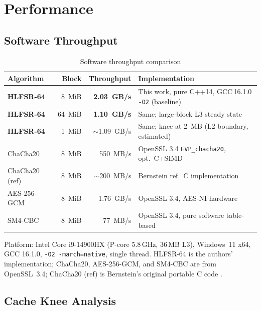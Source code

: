 \documentclass[11pt,a4paper]{article}
\begin{document}
\section{Performance}

\subsection{Software Throughput}

\begin{table}[H]
\centering
\begin{tabular}{@{}lrrp{4.5cm}@{}}
\toprule
\textbf{Algorithm} & \textbf{Block} & \textbf{Throughput} & \textbf{Implementation} \\
\midrule
\textbf{HLFSR-64} & 8~MiB  & \textbf{2.03~GB/s} & This work, pure C++14, GCC\,16.1.0 \texttt{-O2} (baseline) \\
\textbf{HLFSR-64} & 64~MiB & \textbf{1.10~GB/s} & Same; large-block L3 steady state \\
\textbf{HLFSR-64} & 1~MiB  & $\sim$1.09~GB/s & Same; knee at 2~MB (L2 boundary, estimated) \\
ChaCha20          & 8~MiB  & 550~MB/s   & OpenSSL 3.4 \texttt{EVP\_chacha20}, opt.\ C+SIMD \\
ChaCha20 (ref)    & 8~MiB  & $\sim$200~MB/s & Bernstein ref.\ C implementation \cite{chacha} \\
AES-256-GCM       & 8~MiB  & 1.76~GB/s  & OpenSSL 3.4, AES-NI hardware \\
SM4-CBC           & 8~MiB  & 77~MB/s    & OpenSSL 3.4, pure software table-based \\
\bottomrule
\end{tabular}
\caption{Software throughput comparison}
\label{tab:swperf}
\end{table}

Platform: Intel Core i9-14900HX (P-core 5.8\,GHz, 36\,MB L3), Windows~11 x64,
GCC 16.1.0, \texttt{-O2 -march=native}, single thread. HLFSR-64 is the authors'
implementation; ChaCha20, AES-256-GCM, and SM4-CBC are from OpenSSL~3.4; ChaCha20
(ref) is Bernstein's original portable C code \cite{chacha}.

\subsection{Cache Knee Analysis}
\end{document}
